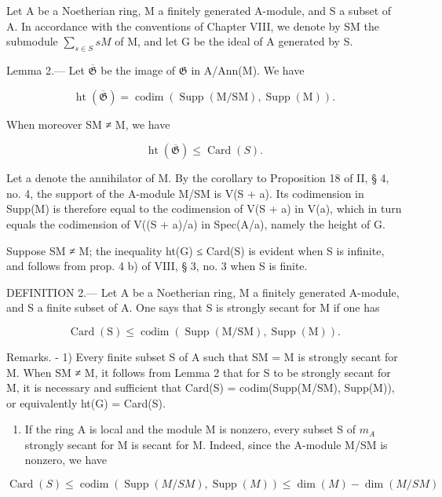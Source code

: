 Let A be a Noetherian ring, M a finitely generated A-module, and S a subset of A. In accordance with the conventions of Chapter VIII, we denote by SM the submodule \(\sum_{s\in S}sM\) of M, and let G be the ideal of A generated by S.

Lemma 2.--- Let \(\overline{\mathfrak{G}}\) be the image of \(\mathfrak{G}\) in A/Ann(M). We have

\[
\operatorname{ht} (\overline {{\mathfrak {G}}}) = \operatorname{codim} (\operatorname{Supp} (\mathrm{M} / \mathrm{SM}), \operatorname{Supp} (\mathrm{M})) .
\]

When moreover SM ≠ M, we have

\[
\operatorname{ht} (\overline {{{\mathfrak {G}}}}) \leqslant \operatorname{Card} (S).
\]

Let a denote the annihilator of M. By the corollary to Proposition 18 of II, § 4, no. 4, the support of the A-module M/SM is V(S + a). Its codimension in Supp(M) is therefore equal to the codimension of V(S + a) in V(a), which in turn equals the codimension of V((S + a)/a) in Spec(A/a), namely the height of G.

Suppose SM ≠ M; the inequality ht(G) ≤ Card(S) is evident when S is infinite, and follows from prop. 4 b) of VIII, § 3, no. 3 when S is finite.

DEFINITION 2.--- Let A be a Noetherian ring, M a finitely generated A-module, and S a finite subset of A. One says that S is strongly secant for M if one has

\[
\operatorname{Card} (\mathrm{S}) \leqslant \operatorname{codim} (\operatorname{Supp} (\mathrm{M} / \mathrm{SM}), \operatorname{Supp} (\mathrm{M})) .
\]

Remarks. - 1) Every finite subset S of A such that SM = M is strongly secant for M. When SM ≠ M, it follows from Lemma 2 that for S to be strongly secant for M, it is necessary and sufficient that Card(S) = codim(Supp(M/SM), Supp(M)), or equivalently ht(G) = Card(S).

\begin{enumerate}
\def\labelenumi{\arabic{enumi})}
\setcounter{enumi}{1}
\tightlist
\item
  If the ring A is local and the module M is nonzero, every subset S of \(m_{A}\) strongly secant for M is secant for M. Indeed, since the A-module M/SM is nonzero, we have
\end{enumerate}

\[
\operatorname{Card} (S) \leqslant \operatorname{codim} (\operatorname{Supp} (M / S M), \operatorname{Supp} (M)) \leqslant \dim (M) - \dim (M / S M)
\]

